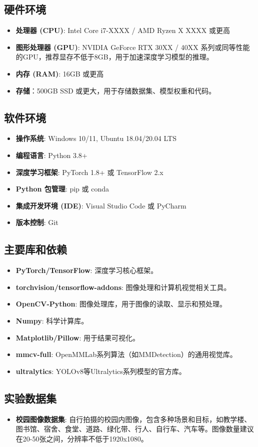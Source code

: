 \subsection{硬件环境}
\begin{itemize}
    \item \textbf{处理器 (CPU)}: Intel Core i7-XXXX / AMD Ryzen X XXXX 或更高
    \item \textbf{图形处理器 (GPU)}: NVIDIA GeForce RTX 30XX / 40XX 系列或同等性能的GPU，推荐显存不低于8GB，用于加速深度学习模型的推理。
    \item \textbf{内存 (RAM)}: 16GB 或更高
    \item \textbf{存储}：500GB SSD 或更大，用于存储数据集、模型权重和代码。
\end{itemize}

\subsection{软件环境}
\begin{itemize}
    \item \textbf{操作系统}: Windows 10/11, Ubuntu 18.04/20.04 LTS
    \item \textbf{编程语言}: Python 3.8+
    \item \textbf{深度学习框架}: PyTorch 1.8+ 或 TensorFlow 2.x
    \item \textbf{Python 包管理}: pip 或 conda
    \item \textbf{集成开发环境 (IDE)}: Visual Studio Code 或 PyCharm
    \item \textbf{版本控制}: Git
\end{itemize}

\subsection{主要库和依赖}
\begin{itemize}
    \item \textbf{PyTorch/TensorFlow}: 深度学习核心框架。
    \item \textbf{torchvision/tensorflow-addons}: 图像处理和计算机视觉相关工具。
    \item \textbf{OpenCV-Python}: 图像处理库，用于图像的读取、显示和预处理。
    \item \textbf{Numpy}: 科学计算库。
    \item \textbf{Matplotlib/Pillow}: 用于结果可视化。
    \item \textbf{mmcv-full}: OpenMMLab系列算法（如MMDetection）的通用视觉库。
    \item \textbf{ultralytics}: YOLOv8等Ultralytics系列模型的官方库。
\end{itemize}

\subsection{实验数据集}
\begin{itemize}
    \item \textbf{校园图像数据集}: 自行拍摄的校园内图像，包含多种场景和目标，如教学楼、图书馆、宿舍、食堂、道路、绿化带、行人、自行车、汽车等。图像数量建议在20-50张之间，分辨率不低于1920x1080。
\end{itemize}
